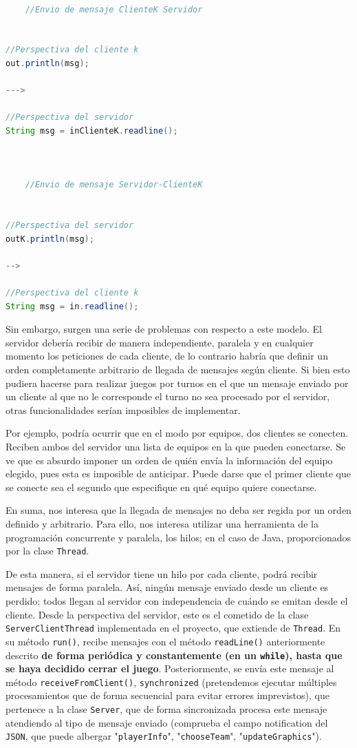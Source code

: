 \documentclass[../DocumentoOficial.tex]{subfiles}
\begin{document}
\begin{lstlisting}[frame=single, language=Java]

	//Envio de mensaje ClienteK Servidor


//Perspectiva del cliente k
out.println(msg);

--->

//Perspectiva del servidor
String msg = inClienteK.readline();



	//Envio de mensaje Servidor-ClienteK


//Perspectiva del servidor
outK.println(msg);

-->

//Perspectiva del cliente k
String msg = in.readline();
\end{lstlisting}

Sin embargo, surgen una serie de problemas con respecto a este modelo. El servidor debería recibir de manera independiente, paralela y en cualquier momento los peticiones de cada cliente, de lo contrario habría que definir un orden completamente arbitrario de llegada de mensajes según cliente. Si bien esto pudiera hacerse para realizar juegos por turnos en el que un mensaje enviado por un cliente al que no le corresponde el turno no sea procesado por el servidor, otras funcionalidades serían imposibles de implementar.

Por ejemplo, podría ocurrir que en el modo por equipos, dos clientes se conecten. Reciben ambos del servidor una lista de equipos en la que pueden conectarse. Se ve que es absurdo imponer un orden de quién envía la información del equipo elegido, pues esta es imposible de anticipar. Puede darse que el primer cliente que se conecte sea el segundo que especifique en qué equipo quiere conectarse.

En suma, nos interesa que la llegada de mensajes no deba ser regida por un orden definido y arbitrario. Para ello, nos interesa utilizar una herramienta de la programación concurrente y paralela, los hilos; en el caso de Java, proporcionados por la clase \texttt{Thread}.

De esta manera, si el servidor tiene un hilo por cada cliente, podrá recibir mensajes de forma paralela. Así, ningún mensaje enviado desde un cliente es perdido; todos llegan al servidor con independencia de cuándo se emitan desde el cliente. Desde la perspectiva del servidor, este es el cometido de la clase \texttt{ServerClientThread} implementada en el proyecto, que extiende de \texttt{Thread}. En su método \texttt{run()}, recibe mensajes con el método \texttt{readLine()} anteriormente descrito \textbf{de forma periódica y constantemente (en un \texttt{while}), hasta que se haya decidido cerrar el juego}. Posteriormente, se envía este mensaje al método \texttt{receiveFromClient()}, \texttt{synchronized} (pretendemos ejecutar múltiples procesamientos que de forma secuencial para evitar errores imprevistos), que pertenece a la clase \texttt{Server}, que de forma sincronizada procesa este mensaje atendiendo al tipo de mensaje enviado (comprueba el campo notification del \texttt{JSON}, que puede albergar "\texttt{playerInfo}", "\texttt{chooseTeam}", "\texttt{updateGraphics}").
\end{document}
